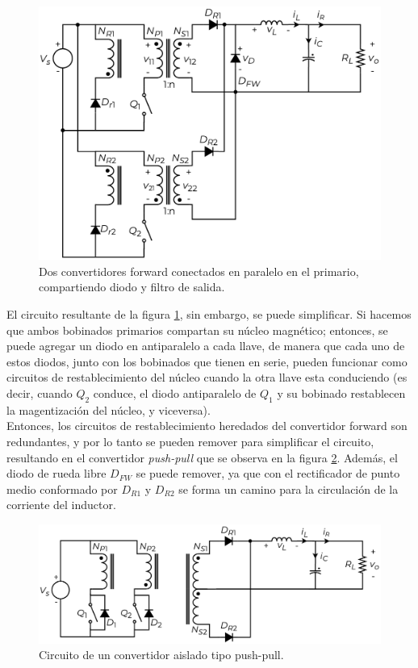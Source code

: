 \begin{figure}[h]
    \centering
    \includegraphics[scale=0.6]{Imagenes/Desarrollo Push-Pull 1.pdf}
    \caption{Dos convertidores forward conectados en paralelo en el primario, compartiendo diodo y filtro de salida.}
    \label{desarrollo_pushpull}
\end{figure}

El circuito resultante de la figura \ref{desarrollo_pushpull}, sin embargo, se puede simplificar. Si hacemos que ambos bobinados primarios compartan su núcleo magnético; entonces, se puede agregar un diodo en antiparalelo a cada llave, de manera que cada uno de estos diodos, junto con los bobinados que tienen en serie, pueden funcionar como circuitos de restablecimiento del núcleo cuando la otra llave esta conduciendo (es decir, cuando $Q_2$ conduce, el diodo antiparalelo de $Q_1$ y su bobinado restablecen la magentización del núcleo, y viceversa).\\

Entonces, los circuitos de restablecimiento heredados del convertidor forward son redundantes, y por lo tanto se pueden remover para simplificar el circuito, resultando en el {\Medium convertidor \textit{push-pull}} que se observa en la figura \ref{pushpull}. Además, el diodo de rueda libre $D_{FW}$ se puede remover, ya que con el rectificador de punto medio conformado por $D_{R1}$ y $D_{R2}$ se forma un camino para la circulación de la corriente del inductor.\\

\begin{figure}[h]
    \centering
    \includegraphics[scale=0.6]{Imagenes/Push-Pull.pdf}
    \caption{Circuito de un convertidor aislado tipo push-pull.}
    \label{pushpull}
\end{figure}

